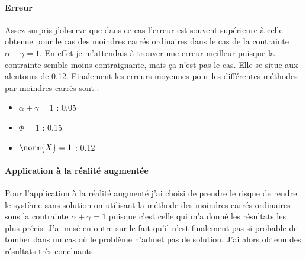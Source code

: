 \paragraph{Erreur}
Assez surpris j'observe que dans ce cas l'erreur est souvent supérieure à celle obtenue pour le cas des moindres carrés ordinaires dans le cas de la contrainte $\alpha + \gamma = 1$. En effet je m'attendais à trouver une erreur meilleur puisque la contrainte semble moins contraignante, mais ça n'est pas le cas. Elle se situe aux alentours de 0.12. Finalement les erreurs moyennes pour les différentes méthodes par moindres carrés sont :
\begin{itemize}
    \item $\alpha + \gamma = 1$ : 0.05
    \item $\Phi = 1$ : 0.15
    \item $\norm{X} = 1$ : 0.12
\end{itemize}

\paragraph{Application à la réalité augmentée}
Pour l'application à la réalité augmenté j'ai choisi de prendre le risque de rendre le système sans solution on utilisant la méthode des moindres carrés ordinaires sous la contrainte $\alpha + \gamma = 1$ puisque c'est celle qui m'a donné les résultats les plus précis. J'ai misé en outre sur le fait qu'il n'est finalement pas si probable de tomber dans un cas où le problème n'admet pas de solution. J'ai alors obtenu des résultats très concluants.
